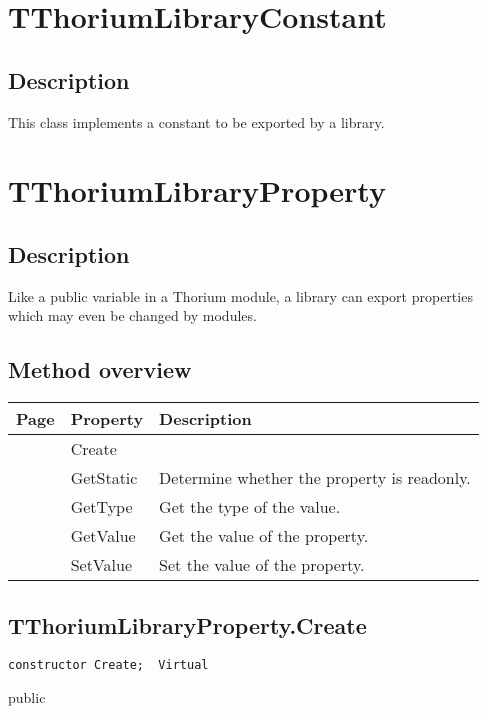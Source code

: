 \section{TThoriumLibraryConstant}
\label{thoriumcorepkg:thorium:tthoriumlibraryconstant}
\subsection{Description}
This class implements a constant to be exported by a library.%
\section{TThoriumLibraryProperty}
\label{thoriumcorepkg:thorium:tthoriumlibraryproperty}
\subsection{Description}
Like a public variable in a Thorium module, a library can export properties which may even be changed by modules.%
\subsection{Method overview}
\label{thoriumcorepkg:thorium:tthoriumlibraryproperty:methods}
\begin{tabularx}{\textwidth}{llX}
Page & Property & Description  \\ \hline
\pageref{thoriumcorepkg:thorium:tthoriumlibraryproperty:create} & Create  &  \\
\pageref{thoriumcorepkg:thorium:tthoriumlibraryproperty:getstatic} & GetStatic  & Determine whether the property is readonly. \\
\pageref{thoriumcorepkg:thorium:tthoriumlibraryproperty:gettype} & GetType  & Get the type of the value. \\
\pageref{thoriumcorepkg:thorium:tthoriumlibraryproperty:getvalue} & GetValue  & Get the value of the property. \\
\pageref{thoriumcorepkg:thorium:tthoriumlibraryproperty:setvalue} & SetValue  & Set the value of the property. \\
\hline
\end{tabularx}
\subsection{TThoriumLibraryProperty.Create}
\label{thoriumcorepkg:thorium:tthoriumlibraryproperty:create}
\begin{FPCList}
\Declaration 

\begin{verbatim}
constructor Create;  Virtual
\end{verbatim}
\Visibility
public
\end{FPCList}
